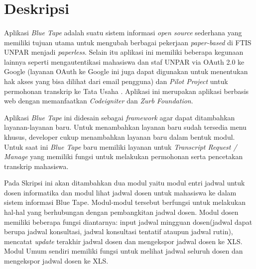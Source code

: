 \documentclass[a4paper,twoside]{article}
\begin{document}
\title{\@judultopik}
\author{\nama \textendash \@npm} 

\newcommand{\nama}{Adrian Reynaldi}
\newcommand{\@npm}{2013730058}
\newcommand{\@judultopik}{Aplikasi Pembangkit Jadwal Dosen} %
\newcommand{\jumpemb}{1} %
\newcommand{\tanggal}{14/02/2017}


\maketitle


\section{Deskripsi}

\paragraph{} Aplikasi \textit{Blue Tape} adalah suatu sistem informasi \textit{open source} sederhana yang memiliki tujuan utama untuk mengubah berbagai pekerjaan \textit{paper-based} di FTIS UNPAR menjadi \textit{paperless}. Selain itu aplikasi ini memiliki beberapa kegunaan lainnya seperti mengautentikasi mahasiswa dan staf UNPAR via OAuth 2.0 ke Google (layanan OAuth ke Google ini juga dapat digunakan untuk menentukan hak akses yang bisa dilihat dari email pengguna) dan \textit{Pilot Project} untuk permohonan transkrip ke Tata Usaha . Aplikasi ini merupakan aplikasi berbasis web dengan memanfaatkan \textit{Codeigniter} dan \textit{Zurb Foundation}. 

Aplikasi \textit{Blue Tape} ini didesain sebagai \textit{framework} agar dapat ditambahkan layanan-layanan baru. Untuk menambahkan layanan baru sudah tersedia menu khusus, developer cukup menambahkan layanan baru dalam bentuk modul. Untuk saat ini \textit{Blue Tape} baru memiliki layanan untuk \textit{Transcript Request / Manage} yang memiliki fungsi untuk melakukan permohonan serta pencetakan transkrip mahasiswa.

Pada Skripsi ini akan ditambahkan dua modul yaitu modul entri jadwal untuk dosen informatika dan modul lihat jadwal dosen untuk mahasiswa ke dalam sistem informasi Blue Tape. Modul-modul tersebut berfungsi untuk melakukan hal-hal yang berhubungan dengan pembangkitan jadwal dosen. Modul dosen memiliki beberapa fungsi diantarnya: input jadwal mingguan dosen(jadwal dapat berupa jadwal konsultasi, jadwal konsultasi tentatif ataupun jadwal rutin), mencatat \textit{update} terakhir jadwal dosen dan mengekspor jadwal dosen ke XLS. Modul Umum sendiri memiliki fungsi untuk melihat jadwal seluruh dosen dan mengekspor jadwal dosen ke XLS.
\end{document}
